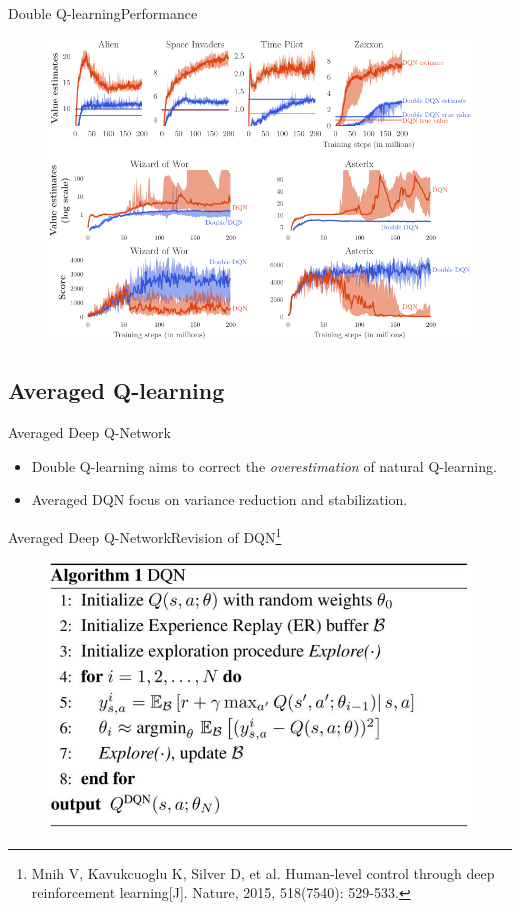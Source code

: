 \documentclass{beamer}
\begin{document}
\begin{frame}{Double Q-learning}{Performance}
\begin{figure}[t]
	\includegraphics[width=0.7\columnwidth]{figures/ddqn-performance.jpg}
\end{figure}
\end{frame}


\subsection{Averaged Q-learning}

\begin{frame}{Averaged Deep Q-Network}
	\begin{itemize}
		\item Double Q-learning aims to correct the \textit{overestimation} of natural Q-learning.
		\item Averaged DQN focus on variance reduction and stabilization.
	\end{itemize}
\end{frame}

\begin{frame}{Averaged Deep Q-Network}{Revision of DQN\footnote{\tiny{Mnih V, Kavukcuoglu K, Silver D, et al. Human-level control through deep reinforcement learning[J]. Nature, 2015, 518(7540): 529-533.}}}
	\begin{figure}[t]
		\includegraphics[width=0.7\columnwidth]{figures/dqn-alg.jpg}
	\end{figure}
\end{frame}
\end{document}
